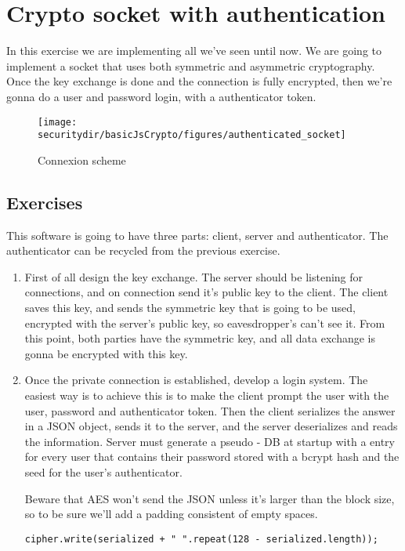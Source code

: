  

\section{Crypto socket with authentication}

In this exercise we are implementing all we've seen until now. We are going to implement a socket that uses both symmetric and asymmetric cryptography. Once the key exchange is done and the connection is fully encrypted, then we're gonna do a user and password login, with a authenticator token.

\begin{figure}[htb]
	\begin{centering}
		\texttt{[image: \\securitydir/basicJsCrypto/figures/authenticated\_socket]}
		\par\end{centering}
	\caption{\label{fig:authenticated_socket} Connexion scheme}
\end{figure}


\subsection{Exercises}
This software is going to have three parts: client, server and authenticator. The authenticator can be recycled from the previous exercise. 
\begin{enumerate}
	\item First of all design the key exchange. The server should be listening for connections, and on connection send it's public key to the client. The client saves this key, and sends the symmetric key that is going to be used, encrypted with the server's public key, so eavesdropper's can't see it. From this point, both parties have the symmetric key, and all data exchange is gonna be encrypted with this key.
	
	\item Once the private connection is established, develop a login system. The easiest way is to achieve this is to make the client prompt the user with the user, password and authenticator token. Then the client serializes the answer in a JSON object, sends it to the server, and the server deserializes and reads the information. Server must generate a pseudo - DB at startup with a entry for every user that contains their password stored with a bcrypt hash and the seed for the user's authenticator.
	
	Beware that AES won't send the JSON unless it's larger than the block size, so to be sure we'll add a padding consistent of empty spaces.
	
	\begin{lstlisting}[style=JavaScript]
	cipher.write(serialized + " ".repeat(128 - serialized.length));
	\end{lstlisting}
\end{enumerate}


